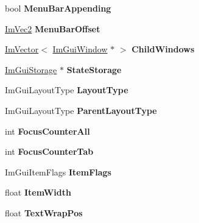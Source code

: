 \begin{DoxyCompactItemize}
bool {\bfseries Menu\+Bar\+Appending}
\item 
\mbox{\label{structImGuiWindowTempData_ad83c8b499933d7c765dc564e2d75c302}} 
\hyperlink{structImVec2}{Im\+Vec2} {\bfseries Menu\+Bar\+Offset}
\item 
\mbox{\label{structImGuiWindowTempData_ac5ffaaf397b8501b523aa55aa7d34d3d}} 
\hyperlink{structImVector}{Im\+Vector}$<$ \hyperlink{structImGuiWindow}{Im\+Gui\+Window} $\ast$ $>$ {\bfseries Child\+Windows}
\item 
\mbox{\label{structImGuiWindowTempData_ae8dad2f03fe834cb6b24cb76efe62c59}} 
\hyperlink{structImGuiStorage}{Im\+Gui\+Storage} $\ast$ {\bfseries State\+Storage}
\item 
\mbox{\label{structImGuiWindowTempData_a56c2607a6965314ec05a351ac6b68c83}} 
Im\+Gui\+Layout\+Type {\bfseries Layout\+Type}
\item 
\mbox{\label{structImGuiWindowTempData_af5f90b71ddcca637fdfd84827d096a9a}} 
Im\+Gui\+Layout\+Type {\bfseries Parent\+Layout\+Type}
\item 
\mbox{\label{structImGuiWindowTempData_a920145ccb1b40ecc3df0908fe1d87edb}} 
int {\bfseries Focus\+Counter\+All}
\item 
\mbox{\label{structImGuiWindowTempData_aaa79b2a64e714edc62f5bdbf6e71516c}} 
int {\bfseries Focus\+Counter\+Tab}
\item 
\mbox{\label{structImGuiWindowTempData_a58af415d3d3fc3e5d6925884a35c17f1}} 
Im\+Gui\+Item\+Flags {\bfseries Item\+Flags}
\item 
\mbox{\label{structImGuiWindowTempData_abc1312710a2091709415d425d2ffc971}} 
float {\bfseries Item\+Width}
\item 
\mbox{\label{structImGuiWindowTempData_a4f9366e24dce97f0cc3ecc0e19436db5}} 
float {\bfseries Text\+Wrap\+Pos}
\item 

\end{DoxyCompactItemize}
